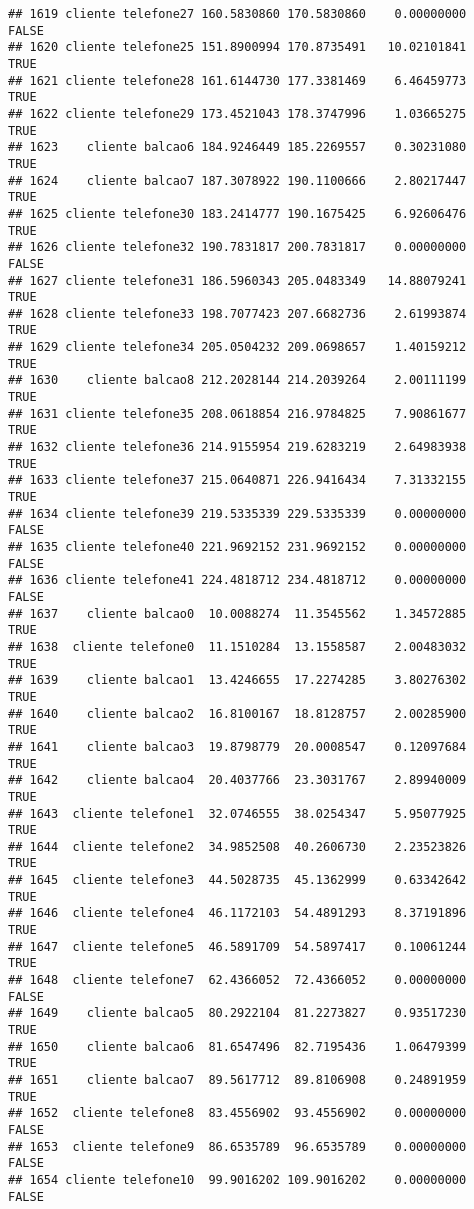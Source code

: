 \documentclass[
]{article}
\begin{document}
\begin{verbatim}
## 1619 cliente telefone27 160.5830860 170.5830860    0.00000000    FALSE
## 1620 cliente telefone25 151.8900994 170.8735491   10.02101841     TRUE
## 1621 cliente telefone28 161.6144730 177.3381469    6.46459773     TRUE
## 1622 cliente telefone29 173.4521043 178.3747996    1.03665275     TRUE
## 1623    cliente balcao6 184.9246449 185.2269557    0.30231080     TRUE
## 1624    cliente balcao7 187.3078922 190.1100666    2.80217447     TRUE
## 1625 cliente telefone30 183.2414777 190.1675425    6.92606476     TRUE
## 1626 cliente telefone32 190.7831817 200.7831817    0.00000000    FALSE
## 1627 cliente telefone31 186.5960343 205.0483349   14.88079241     TRUE
## 1628 cliente telefone33 198.7077423 207.6682736    2.61993874     TRUE
## 1629 cliente telefone34 205.0504232 209.0698657    1.40159212     TRUE
## 1630    cliente balcao8 212.2028144 214.2039264    2.00111199     TRUE
## 1631 cliente telefone35 208.0618854 216.9784825    7.90861677     TRUE
## 1632 cliente telefone36 214.9155954 219.6283219    2.64983938     TRUE
## 1633 cliente telefone37 215.0640871 226.9416434    7.31332155     TRUE
## 1634 cliente telefone39 219.5335339 229.5335339    0.00000000    FALSE
## 1635 cliente telefone40 221.9692152 231.9692152    0.00000000    FALSE
## 1636 cliente telefone41 224.4818712 234.4818712    0.00000000    FALSE
## 1637    cliente balcao0  10.0088274  11.3545562    1.34572885     TRUE
## 1638  cliente telefone0  11.1510284  13.1558587    2.00483032     TRUE
## 1639    cliente balcao1  13.4246655  17.2274285    3.80276302     TRUE
## 1640    cliente balcao2  16.8100167  18.8128757    2.00285900     TRUE
## 1641    cliente balcao3  19.8798779  20.0008547    0.12097684     TRUE
## 1642    cliente balcao4  20.4037766  23.3031767    2.89940009     TRUE
## 1643  cliente telefone1  32.0746555  38.0254347    5.95077925     TRUE
## 1644  cliente telefone2  34.9852508  40.2606730    2.23523826     TRUE
## 1645  cliente telefone3  44.5028735  45.1362999    0.63342642     TRUE
## 1646  cliente telefone4  46.1172103  54.4891293    8.37191896     TRUE
## 1647  cliente telefone5  46.5891709  54.5897417    0.10061244     TRUE
## 1648  cliente telefone7  62.4366052  72.4366052    0.00000000    FALSE
## 1649    cliente balcao5  80.2922104  81.2273827    0.93517230     TRUE
## 1650    cliente balcao6  81.6547496  82.7195436    1.06479399     TRUE
## 1651    cliente balcao7  89.5617712  89.8106908    0.24891959     TRUE
## 1652  cliente telefone8  83.4556902  93.4556902    0.00000000    FALSE
## 1653  cliente telefone9  86.6535789  96.6535789    0.00000000    FALSE
## 1654 cliente telefone10  99.9016202 109.9016202    0.00000000    FALSE

\end{verbatim}
\end{document}

